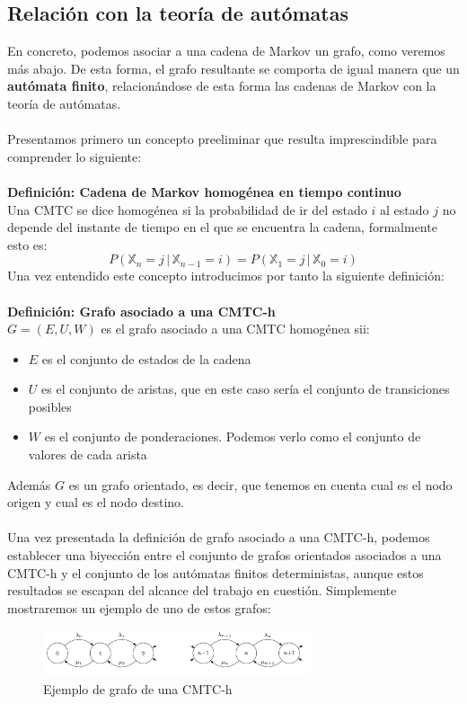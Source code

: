 \documentclass[12pt,a4paper]{article}
\begin{document}
\subsection{Relación con la teoría de autómatas}
En concreto, podemos asociar a una cadena de Markov un grafo, como veremos más abajo. De esta forma, el grafo resultante se comporta de igual manera que un \textbf{autómata finito}, relacionándose de esta forma las cadenas de Markov con la teoría de autómatas.
\\\\
Presentamos primero un concepto preeliminar que resulta imprescindible para comprender lo siguiente:
\\\\
\textbf{Definición: Cadena de Markov homogénea en tiempo continuo}
\\
Una CMTC se dice homogénea si la probabilidad de ir del estado $i$ al estado $j$ no depende del instante de tiempo en el que se encuentra la cadena, formalmente esto es:
$$P(\mathbb{X}_n=j \, | \, \mathbb{X}_{n-1}=i)=P(\mathbb{X}_1=j \, | \, \mathbb{X}_0=i)$$
Una vez entendido este concepto introducimos por tanto la siguiente definición:
\\\\
\textbf{Definición: Grafo asociado a una CMTC-h}
\\
$G=(E,U,W)$ es el grafo asociado a una CMTC homogénea sii:
\begin{itemize}
\item $E$ es el conjunto de estados de la cadena
\item $U$ es el conjunto de aristas, que en este caso sería el conjunto de transiciones posibles
\item $W$ es el conjunto de ponderaciones. Podemos verlo como el conjunto de valores de cada arista
\end{itemize}
Además $G$ es un grafo orientado, es decir, que tenemos en cuenta cual es el nodo origen y cual es el nodo destino.
\\\\
Una vez presentada la definición de grafo asociado a una CMTC-h, podemos establecer una biyección entre el conjunto de grafos orientados asociados a una CMTC-h y el conjunto de los autómatas finitos deterministas, aunque estos resultados se escapan del alcance del trabajo en cuestión. Simplemente mostraremos un ejemplo de uno de estos grafos:
\\
\begin{figure}[h]
  \centering
    \includegraphics[width=0.7\textwidth]{img/grafo.png}
  \caption{Ejemplo de grafo de una CMTC-h}
  \label{fig:ejemplo}
\end{figure}
\end{document}
